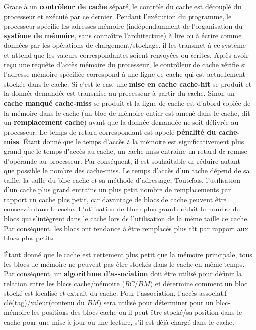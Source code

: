Grace à un \textbf{contrôleur de cache} séparé, le contrôle du cache est découplé du processeur et exécuté par ce dernier.
Pendant l'exécution du programme, 
le processeur spécifie les adresses mémoire (indépendamment de l'organisation du \textbf{système de mémoire}, sans connaître l'architecture) à lire ou à écrire comme données par les opérations de chargement/stockage. %
il les transmet à ce système et attend que les valeurs correspondantes soient renvoyées ou écrites. %
Après avoir reçu une requête d'accès mémoire du processeur, 
le contrôleur de cache vérifie si l'adresse mémoire spécifiée correspond à une ligne de cache qui est actuellement stockée dans le cache. %
Si c'est le cas, une \textbf{mise en cache cache-hit} se produit et la donnée demandée est transmise au processeur à partir du cache. %
Sinon un \textbf{cache manqué cache-miss} se produit et 
la ligne de cache est d'abord copiée de la mémoire dans le cache (un bloc de mémoire entier est amené dans le cache, dit un \textbf{remplacement cache})
avant que la donnée demandée ne soit délivrée au processeur. %
%
Le temps de retard correspondant est appelé \textbf{pénalité du cache-miss}. 
%
Étant donné que le temps d'accès à la mémoire est significativement plus grand que le temps d'accès au cache, un cache-miss entraîne un retard de remise d'opérande au processeur.
Par conséquent, il est souhaitable de réduire autant que possible le nombre des cache-miss.
%
Le temps d'accès d'un cache dépend de sa taille, la taille du bloc-cache et sa méthode d'adressage, 
%
Toutefois, l'utilisation d'un cache plus grand entraîne un plus petit nombre de remplacements par rapport un cache plus petit, car davantage de blocs de cache peuvent être conservés dans le cache. 
%
L'utilisation de blocs plus grands réduit le nombre de blocs qui s'intègrent dans le cache lors de l'utilisation de la même taille de cache. Par conséquent, les blocs ont tendance à être remplacés plus tôt par rapport aux blocs plus petits. 

Étant donné que le cache est nettement plus petit que la mémoire principale, tous les blocs de mémoire ne peuvent pas être stockés dans le cache en même temps. 
Par conséquent, un \textbf{algorithme d'association} doit être utilisé pour définir la relation entre les blocs cache/mémoire ($BC$/$BM$) et détermine comment un bloc stocké est localisé et extrait du cache.
Pour l'association, l'accès associatif clé(tag)/valeur(contenu du $BM$) sera utilisé pour déterminer pour un bloc-mémoire les positions des blocs-cache ou il peut être stocké/sa position dans le cache pour une mise à jour ou une lecture, s'il est déjà chargé dans le cache. \cite{Hunold07}
%
